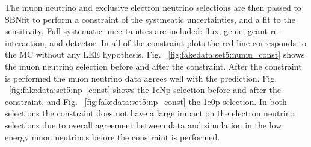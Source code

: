 
The muon neutrino and exclusive electron neutrino selections are then passed to SBNfit to perform a constraint of the systmeatic uncertainties, and a fit to the sensitivity.  Full systematic uncertainties are included: flux, genie, geant re-interaction, and detector.  In all of the constraint plots the red line corresponds to the MC without any LEE hypothesis. Fig. ~\ref{fig:fakedata:set5:numu_const} shows the muon neutrino selection before and after the constraint. After the constraint is performed the muon neutrino data agrees well with the prediction.   
Fig. ~\ref{fig:fakedata:set5:np_const} shows the 1eNp selection before and after the constraint, and Fig. ~\ref{fig:fakedata:set5:np_const} the 1e0p selection.  In both selections the constraint does not have a large impact on the electron neutrino selections due to overall agreement between data and simulation in the low energy muon neutrinos before the constraint is performed.

